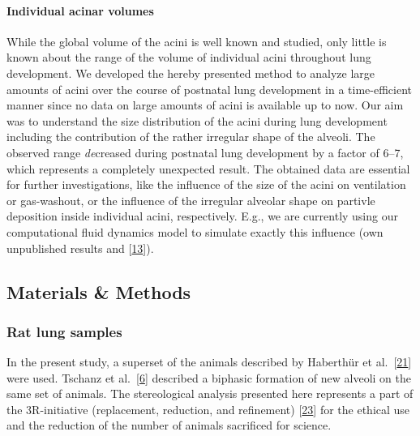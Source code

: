 \documentclass[
  american,
]{article}
\begin{document}
\hypertarget{individual-acinar-volumes}{%
\paragraph{Individual acinar volumes}\label{individual-acinar-volumes}}

While the global volume of the acini is well known and studied, only little is known about the range of the volume of individual acini throughout lung development.
We developed the hereby presented method to analyze large amounts of acini over the course of postnatal lung development in a time-efficient manner since no data on large amounts of acini is available up to now.
Our aim was to understand the size distribution of the acini during lung development including the contribution of the rather irregular shape of the alveoli.
The observed range \emph{de}creased during postnatal lung development by a factor of 6--7, which represents a completely unexpected result.
The obtained data are essential for further investigations, like the influence of the size of the acini on ventilation or gas-washout, or the influence of the irregular alveolar shape on partivle deposition inside individual acini, respectively.
E.g., we are currently using our computational fluid dynamics model to simulate exactly this influence (own unpublished results and {[}\protect\hyperlink{ref-eb0gk6VO}{13}{]}).

\hypertarget{materials-methods}{%
\subsection{Materials \& Methods}\label{materials-methods}}

\hypertarget{rat-lung-samples}{%
\subsubsection{Rat lung samples}\label{rat-lung-samples}}

In the present study, a superset of the animals described by Haberthür et al.~{[}\protect\hyperlink{ref-7YLeeyu}{21}{]} were used.
Tschanz et al.~{[}\protect\hyperlink{ref-wnl86DEM}{6}{]} described a biphasic formation of new alveoli on the same set of animals.
The stereological analysis presented here represents a part of the 3R-initiative (replacement, reduction, and refinement) {[}\protect\hyperlink{ref-199ALtdJt}{23}{]} for the ethical use and the reduction of the number of animals sacrificed for science.
\end{document}

